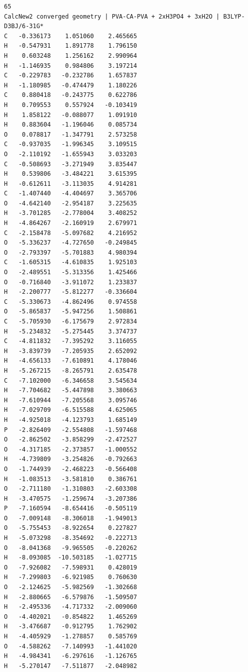 \documentclass[12pt,a4paper]{report}
\begin{document}
\begin{verbatim}
65
CalcNew2 converged geometry | PVA-CA-PVA + 2xH3PO4 + 3xH2O | B3LYP-D3BJ/6-31G*
C   -0.336173    1.051060    2.465665
H   -0.547931    1.891778    1.796150
H    0.603248    1.256162    2.990964
H   -1.146935    0.984806    3.197214
C   -0.229783   -0.232786    1.657837
H   -1.180985   -0.474479    1.180226
C    0.880418   -0.243775    0.622786
H    0.709553    0.557924   -0.103419
H    1.858122   -0.088077    1.091910
H    0.883604   -1.196046    0.085734
O    0.078817   -1.347791    2.573258
C   -0.937035   -1.996345    3.109515
O   -2.110192   -1.655943    3.033203
C   -0.508693   -3.271949    3.835447
H    0.539806   -3.484221    3.615395
H   -0.612611   -3.113035    4.914281
C   -1.407440   -4.404697    3.365706
O   -4.642140   -2.954187    3.225635
H   -3.701285   -2.778004    3.408252
H   -4.864267   -2.160919    2.679971
C   -2.158478   -5.097682    4.216952
O   -5.336237   -4.727650   -0.249845
O   -2.793397   -5.701883    4.980394
C   -1.605315   -4.610835    1.925103
O   -2.489551   -5.313356    1.425466
O   -0.716840   -3.911072    1.233837
H   -2.200777   -5.812277   -0.336604
C   -5.330673   -4.862496    0.974558
O   -5.865837   -5.947256    1.508861
C   -5.705930   -6.175679    2.972834
H   -5.234832   -5.275445    3.374737
C   -4.811832   -7.395292    3.116055
H   -3.839739   -7.205935    2.652092
H   -4.656133   -7.610891    4.178046
H   -5.267215   -8.265791    2.635478
C   -7.102000   -6.346658    3.545634
H   -7.704682   -5.447898    3.380663
H   -7.610944   -7.205568    3.095746
H   -7.029709   -6.515588    4.625065
H   -4.925018   -4.123793    1.685149
P   -2.826409   -2.554808   -1.597468
O   -2.862502   -3.858299   -2.472527
O   -4.317185   -2.373857   -1.000552
H   -4.739809   -3.254826   -0.792663
O   -1.744939   -2.468223   -0.566408
H   -1.083513   -3.581810    0.386761
O   -2.711180   -1.310803   -2.603308
H   -3.470575   -1.259674   -3.207386
P   -7.160594   -8.654416   -0.505119
O   -7.009148   -8.306018   -1.949013
O   -5.755453   -8.922654    0.227827
H   -5.073298   -8.354692   -0.222713
O   -8.041368   -9.965505   -0.220262
H   -8.093085  -10.503185   -1.027715
O   -7.926082   -7.598931    0.428019
H   -7.299803   -6.921985    0.760630
O   -2.124625   -5.982569   -1.302668
H   -2.880665   -6.579876   -1.509507
H   -2.495336   -4.717332   -2.009060
O   -4.402021   -0.854822    1.465269
H   -3.476687   -0.912795    1.762902
H   -4.405929   -1.278857    0.585769
O   -4.588262   -7.140993   -1.441020
H   -4.984341   -6.297616   -1.126765
H   -5.270147   -7.511877   -2.048982
\end{verbatim}
\end{document}
